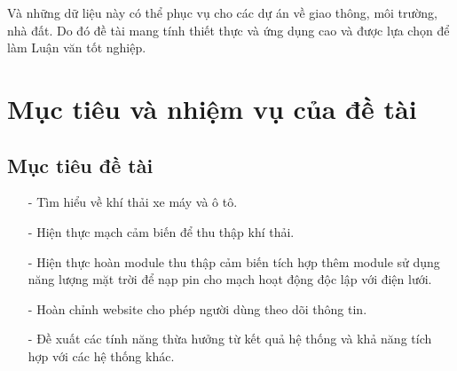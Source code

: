 Và những dữ liệu này có thể phục vụ cho các dự án về giao thông, môi trường, nhà đất. Do đó đề tài mang tính thiết thực và ứng dụng cao và được lựa chọn để làm Luận văn tốt nghiệp.


\section{Mục tiêu và nhiệm vụ của đề tài} %
\label{section1.2}
\subsection{Mục tiêu đề tài}
\begin{itemize}
\item[-]Tìm hiểu về khí thải xe máy và ô tô.
\item[-]Hiện thực mạch cảm biến để thu thập khí thải.
\item[-]Hiện thực hoàn module thu thập cảm biến tích hợp thêm module sử dụng năng lượng mặt trời để nạp pin cho mạch hoạt động độc lập với điện lưới.
\item[-]Hoàn chỉnh website cho phép người dùng theo dõi thông tin.
\item[-]Đề xuất các tính năng thừa hưởng từ kết quả hệ thống và khả năng tích hợp với các hệ thống khác.
\end{itemize}



